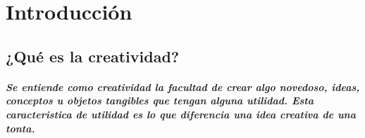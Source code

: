 \chapter{Introducción}
\begin{comment}

Aparte de que faltarían muchos capítulos, en las partes que escribiste hay mucho “qué” (es decir, explicaciones de lo que se hizo), pero falta mucho “por qué” (explicaciones/justificaciones de por qué se hizo, y de por qué se hizo de la manera en la que se hizo y no de cualquier otra manera).

¿Puede una computadora crear algo útil para el ser humano con un universo de elementos previamente provistos por el humano?.
Las tragedias griegas originalmente iban representadas con canto y danza, y se consideraba la poesía, la musica y la danza un solo arte.

¿Cómo surge el sentido de la belleza en el ser humano?

\end{comment}

\begin{comment}
\section{sin nombre}

Una computadora es probablemente la herramienta más útil con la que cuenta el ser humano hoy día, nos ha permitido ir a la luna, mejorar nuestros sistemas de comunicaciones, crear prótesis biónicas

En la actualidad existe una especie de simbiosis humano-máquina cómo probablemente no ha existido en la historia entre el humano y otro ser vivo, al menos de forma conciente. Si bien el ser humano se ha beneficiado mucho de las máquinas no podemos decir que una máquina se haya beneficiado de un humano, responder si una actualización de software o hardware significa un beneficio para la máquina está fuera del proposito de este trabajo, sin embargo asumiremos como premisa el hecho de que una computadora carece de conciencia y que el beneficio o perjucio sólo existen en seres concientes.

\end{comment}

\section{¿Qué es la creatividad?}
\paragraph{Se entiende como creatividad la facultad de crear algo novedoso, ideas, conceptos u objetos tangibles que tengan alguna utilidad. Esta caracteristica de utilidad es lo que diferencia una idea creativa de una tonta.}

